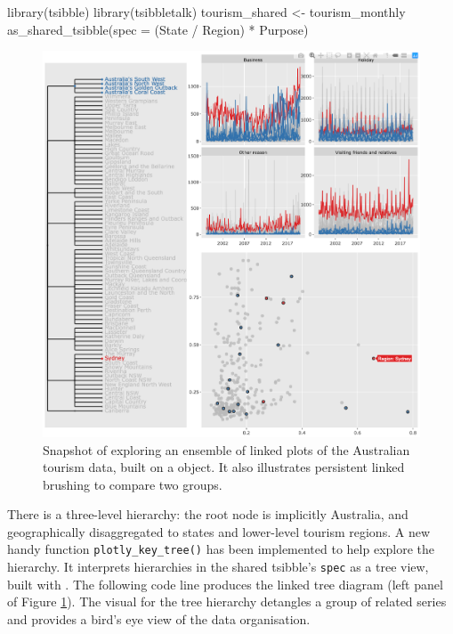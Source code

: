 \begin{Schunk}
\begin{Sinput}
library(tsibble)
library(tsibbletalk)
tourism_shared <- tourism_monthly %
  as_shared_tsibble(spec = (State / Region) * Purpose)
\end{Sinput}
\end{Schunk}

\begin{Schunk}
\begin{figure}

{\centering \includegraphics[width=\textwidth]{img/tourism-linking} 

}

\caption[Snapshot of exploring an ensemble of linked plots of the Australian tourism data, built on a  object]{Snapshot of exploring an ensemble of linked plots of the Australian tourism data, built on a  object. It also illustrates persistent linked brushing to compare two groups.}\label{fig:tourism-linking-fig}
\end{figure}
\end{Schunk}

\noindent There is a three-level hierarchy: the root node is implicitly
Australia, and geographically disaggregated to states and lower-level
tourism regions. A new handy function \texttt{plotly\_key\_tree()} has
been implemented to help explore the hierarchy. It interprets
hierarchies in the shared tsibble's \texttt{spec} as a tree view, built
with . The following code line produces the linked tree
diagram (left panel of Figure \ref{fig:tourism-linking-fig}). The visual
for the tree hierarchy detangles a group of related series and provides
a bird's eye view of the data organisation.

